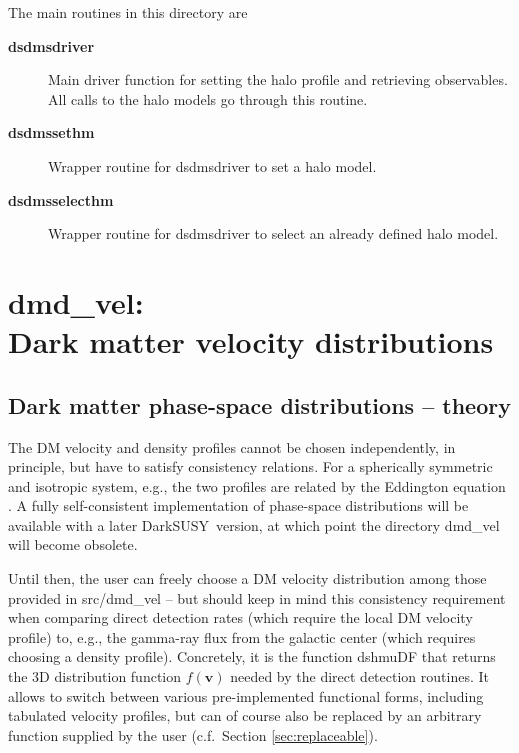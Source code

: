 \documentclass[a4paper,10pt,oneside]{book}
\newcommand{\code}[1]{\ft{#1}}
\newcommand{\codeb}[1]{\ftb{#1}}
\newcommand{\ds}{{\sffamily DarkSUSY}}
\newcommand{\ft}[1]{\textsf{#1}}
\newcommand{\ftb}[1]{{\bfseries \sffamily #1}}
\begin{document}
The main routines in this directory are

\begin{description}
\item[\ftb{dsdmsdriver}]  Main driver function for setting the halo profile and retrieving observables. All calls to the halo
  models go through this routine.
\item[\ftb{dsdmssethm}]  Wrapper routine for dsdmsdriver to set a halo model.
\item[\ftb{dsdmsselecthm}]  Wrapper routine for dsdmsdriver to select an already defined halo model.
\end{description}


\chapter[dmd\_vel: Dark matter velocity distributions]{\codeb{dmd\_vel}:\\ Dark matter velocity distributions}
\label{ch:src/dmd_vel}


\section{Dark matter phase-space distributions -- theory}
\label{sec:dmd_vel}

The DM velocity and density profiles cannot be chosen independently,
in principle, but have to satisfy consistency relations. For 
a spherically symmetric and isotropic system, e.g., the two profiles are related by the 
Eddington equation \cite{1915MNRAS..76...37E,Catena:2011kv}. A fully self-consistent 
implementation of phase-space distributions will be available with a later \ds\ version,
at which point the directory \code{dmd\_vel} will become obsolete. 

Until then, the user can freely choose a DM velocity distribution among those provided in 
\code{src/dmd\_vel} -- but should keep in mind this consistency requirement 
when comparing direct detection rates (which require the local DM velocity profile) to, e.g., 
the gamma-ray flux from the galactic center 
(which requires choosing a density profile). Concretely, it is the function \code{dshmuDF}
that returns the 3D distribution function $f(\mathbf{v})$ needed by the direct detection routines. 
It allows to switch between various pre-implemented functional forms, including tabulated
velocity profiles, but can of course also be replaced by an arbitrary function supplied by the user
(c.f.~Section \ref{sec:replaceable}).
 
\end{document}
